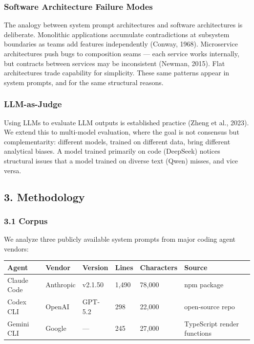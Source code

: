 \documentclass[
]{article}
\begin{document}
\hypertarget{software-architecture-failure-modes}{%
\subsubsection{Software Architecture Failure
Modes}\label{software-architecture-failure-modes}}

The analogy between system prompt architectures and software
architectures is deliberate. Monolithic applications accumulate
contradictions at subsystem boundaries as teams add features
independently (Conway, 1968). Microservice architectures push bugs to
composition seams --- each service works internally, but contracts
between services may be inconsistent (Newman, 2015). Flat architectures
trade capability for simplicity. These same patterns appear in system
prompts, and for the same structural reasons.

\hypertarget{llm-as-judge}{%
\subsubsection{LLM-as-Judge}\label{llm-as-judge}}

Using LLMs to evaluate LLM outputs is established practice (Zheng et
al., 2023). We extend this to multi-model evaluation, where the goal is
not consensus but complementarity: different models, trained on
different data, bring different analytical biases. A model trained
primarily on code (DeepSeek) notices structural issues that a model
trained on diverse text (Qwen) misses, and vice versa.

\hypertarget{methodology}{%
\subsection{3. Methodology}\label{methodology}}

\hypertarget{corpus}{%
\subsubsection{3.1 Corpus}\label{corpus}}

We analyze three publicly available system prompts from major coding
agent vendors:

\begin{longtable}[]{@{}llllll@{}}
\toprule\noalign{}
Agent & Vendor & Version & Lines & Characters & Source \\
\midrule\noalign{}
\endhead
\bottomrule\noalign{}
\endlastfoot
Claude Code & Anthropic & v2.1.50 & 1,490 & 78,000 & npm package \\
Codex CLI & OpenAI & GPT-5.2 & 298 & 22,000 & open-source repo \\
Gemini CLI & Google & --- & 245 & 27,000 & TypeScript render
functions \\
\end{longtable}
\end{document}
